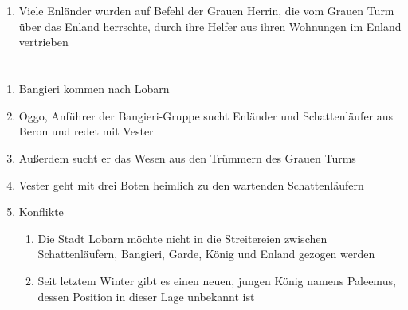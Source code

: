 \documentclass[12pt,a4paper,onecolumn,oneside,ngerman]{book}
\newcommand{\Beron}{Beron}
\newcommand{\Garde}{Garde}
\newcommand{\Bangiri}{Bangieri}
\newcommand{\Oggo}{Oggo}
\newcommand{\Enland}{Enland}
\newcommand{\Enlaender}{Enländer}
\newcommand{\Schattenlaufer}{Schattenläufer}
\newcommand{\Lobarn}{Lobarn}
\newcommand{\Vester}{Vester}
\newcommand{\Naimo}{Naimo}
\newcommand{\Palemus}{Paleemus}
\begin{document}
\chapter[{\Naimo} erzählt die traurige Geschichte der Grauen Herrin und wie das {\Enland} verloren wurde]{}
\begin{enumerate}
  \item Viele {\Enlaender} wurden auf Befehl der Grauen Herrin, die vom Grauen Turm über das {\Enland} herrschte, durch ihre Helfer aus ihren Wohnungen im {\Enland} vertrieben
\end{enumerate}

\chapter[Die {\Bangiri} kommen]{}
\begin{enumerate}
  \item {\Bangiri} kommen nach {\Lobarn}
  \item {\Oggo}, Anführer der {\Bangiri}-Gruppe sucht {\Enlaender} und {\Schattenlaufer} aus {\Beron} und redet mit {\Vester}
  \item Außerdem sucht er das Wesen aus den Trümmern des Grauen Turms
  \item {\Vester} geht mit drei Boten heimlich zu den wartenden {\Schattenlaufer}n
  \item Konflikte
  \begin{enumerate}
    \item Die Stadt {\Lobarn} möchte nicht in die Streitereien zwischen {\Schattenlaufer}n, {\Bangiri}, {\Garde}, König und {\Enland} gezogen werden
    \item Seit letztem Winter gibt es einen neuen, jungen König namens {\Palemus}, dessen Position in dieser Lage unbekannt ist
  \end{enumerate}
\end{enumerate}
\end{document}
